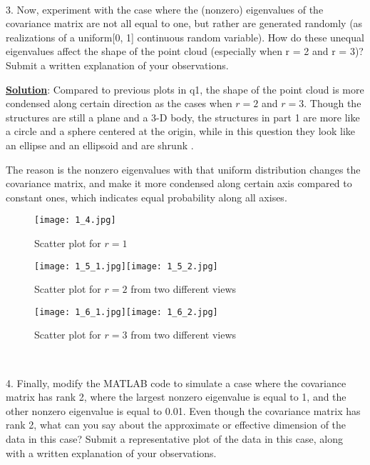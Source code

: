 \documentclass[12pt, letterpaper]{article}
\begin{document}
\


3. Now, experiment with the case where the (nonzero) eigenvalues of the covariance matrix are not all equal to one, but rather are generated randomly (as realizations of a uniform[0, 1] continuous random variable). How do these unequal eigenvalues affect the shape of the point cloud (especially when r = 2 and r = 3)? Submit a written explanation of your observations.

\noindent
\textbf{\underline{Solution}}: Compared to previous plots in q1, the shape of the point cloud is more condensed along certain direction as the cases when $r=2$ and $r=3$. Though the structures are still a plane and a 3-D body, the structures in part 1  are more like a circle and a sphere centered at the origin, while in this question they look like an ellipse and an ellipsoid and are shrunk .

The reason is the nonzero eigenvalues with that uniform distribution changes the covariance matrix, and make it more condensed along certain axis compared to constant ones, which indicates equal probability along all axises.

\begin{figure}[h]
  \centering
  \texttt{[image: 1\_4.jpg]}
  \caption{Scatter plot for $r=1$}
  \label{fig:1_4}
\end{figure}

\begin{figure}[h]
  \centering
  \texttt{[image: 1\_5\_1.jpg]}\texttt{[image: 1\_5\_2.jpg]}
  \caption{Scatter plot for $r=2$ from two different views}
  \label{fig:1_5}
\end{figure}

\begin{figure}[h]
  \centering
  \texttt{[image: 1\_6\_1.jpg]}\texttt{[image: 1\_6\_2.jpg]}
  \caption{Scatter plot for $r=3$ from two different views}
  \label{fig:1_6}
\end{figure}

\


4. Finally, modify the MATLAB code to simulate a case where the covariance matrix has rank 2, where the largest nonzero eigenvalue is equal to 1, and the other nonzero eigenvalue is equal to 0.01. Even though the covariance matrix has rank 2, what can you say about the approximate or effective dimension of the data in this case? Submit a representative plot of the data in this case, along with a written explanation of your observations.

\
\end{document}
